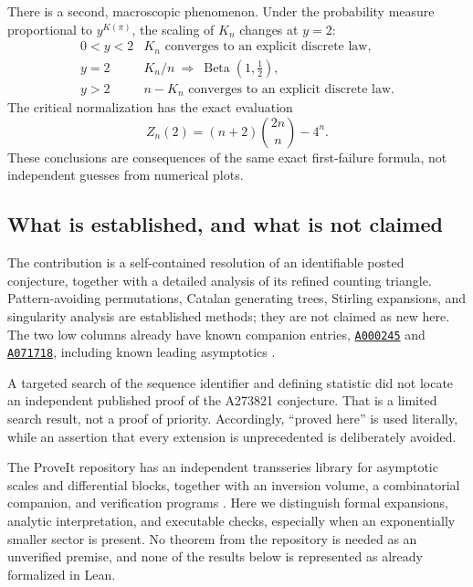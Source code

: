 \documentclass[11pt]{article}
\numberwithin{equation}{section}
\theoremstyle{definition}
\newcommand{\Beta}{\operatorname{Beta}}
\newcommand{\Oeis}[1]{\href{https://oeis.org/#1}{\texttt{#1}}}
\begin{document}
There is a second, macroscopic phenomenon. Under the probability measure
proportional to $y^{K(\pi)}$, the scaling of $K_n$ changes at $y=2$:
\begin{equation}\label{fpf:eq:phase-summary}
\begin{array}{c|c}
 0<y<2 & K_n\text{ converges to an explicit discrete law},\\[2pt]
 y=2 & K_n/n\ \Rightarrow\ \Beta(1,\tfrac12),\\[2pt]
 y>2 & n-K_n\text{ converges to an explicit discrete law}.
\end{array}
\end{equation}
The critical normalization has the exact evaluation
\begin{equation}\label{fpf:eq:critical-preview}
 Z_n(2)=(n+2)\binom{2n}{n}-4^n.
\end{equation}
These conclusions are consequences of the same exact first-failure
formula, not independent guesses from numerical plots.

\subsection{What is established, and what is not claimed}
The contribution is a self-contained resolution of an identifiable posted
conjecture, together with a detailed analysis of its refined counting
triangle. Pattern-avoiding permutations, Catalan generating trees, Stirling
expansions, and singularity analysis are established methods; they are not
claimed as new here. The two low columns already have known companion
entries, \Oeis{A000245} and \Oeis{A071718}, including known leading
asymptotics \cite{oeis245,oeis71718}.

A targeted search of the sequence identifier and defining statistic did
not locate an independent published proof of the A273821 conjecture.
That is a limited search result, not a proof of priority. Accordingly,
``proved here'' is used literally, while an assertion that every extension
is unprecedented is deliberately avoided.

The ProveIt repository has an independent transseries library for asymptotic
scales and differential blocks, together with an inversion volume, a
combinatorial companion, and verification programs \cite{proveit}. Here we
distinguish formal expansions, analytic interpretation, and executable
checks, especially when an exponentially smaller sector is present. No theorem from the
repository is needed as an unverified premise, and none of the results
below is represented as already formalized in Lean.
\end{document}
